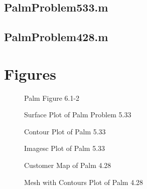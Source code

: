 \documentclass{article}
\begin{document}
\subsection{PalmProblem533.m}
\clearpage

\subsection{PalmProblem428.m}
\clearpage

\section{Figures}
\begin{figure}[htb!p]
\begin{center}
\caption{Palm Figure 6.1-2}
\end{center}
\end{figure}

\begin{figure}[htb!p]
\begin{center}
\caption{Surface Plot of Palm Problem 5.33}
\end{center}
\end{figure}

\begin{figure}[htb!p]
\begin{center}
\caption{Contour Plot of Palm 5.33}
\end{center}
\end{figure}

\begin{figure}[htb!p]
\begin{center}
\caption{Imagesc Plot of Palm 5.33}
\end{center}
\end{figure}

\begin{figure}[htb!p]
\begin{center}
\caption{Customer Map of Palm 4.28}
\end{center}
\end{figure}

\begin{figure}[htb!p]
\begin{center}
\caption{Mesh with Contours Plot of Palm 4.28}
\end{center}
\end{figure}
\end{document}
